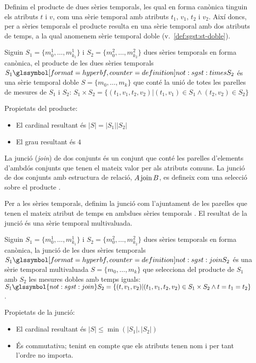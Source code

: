 Definim el producte de dues sèries temporals, les qual en
forma canònica tinguin els atributs $t$ i $v$, com una sèrie temporal
amb atributs $t_1$, $v_1$, $t_2$ i $v_2$. Així doncs, per a sèries
temporals el producte resulta en una sèrie temporal amb dos atributs
de temps, a la qual anomenem sèrie temporal doble (v.\
\autoref{def:sgst:st-doble}).
\begin{definition}[producte]
  Siguin $S_1=\{m_0^1, \dotsc, m_{k_1}^1\}$ i $S_2=\{m_0^2, \dotsc,
  m_{k_2}^2\}$ dues sèries temporals en forma canònica, el producte de
  les dues sèries temporals $S_1 \glssymboldef{not:sgst:times}
  S_2$ és una sèrie temporal doble $S=\{m_0, \dotsc, m_k\}$ que conté
  la unió de totes les parelles de mesures de $S_1$ i $S_2$: $S_1
  \times S_2 = \{ (t_1,v_1,t_2,v_2) | (t_1,v_1) \in S_1 \wedge
  (t_2,v_2) \in S_2 \}$
\end{definition}

Propietats del producte:
\begin{itemize}
\item El cardinal resultant és $|S|=|S_1||S_2|$
\item El grau resultant és $4$
\end{itemize}



La junció (\emph{join}) de dos conjunts és un conjunt que conté les
parelles d'elements d'ambdós conjunts que tenen el mateix valor per
als atributs comuns.  La junció de dos conjunts amb estructura de
relació, $A \operatorname*{join} B$, es defineix com una selecció sobre el
producte \parencite[cap.~7]{date04:introduction8}.


Per a les sèries temporals, definim la junció com l'ajuntament de les
parelles que tenen el mateix atribut de temps en ambdues sèries
temporals . El resultat de la junció és una sèrie temporal
multivaluada.
\begin{definition}[junció]\label{def:sgst:join}
  Siguin $S_1=\{m_0^1, \dotsc, m_{k_1}^1\}$ i $S_2=\{m_0^2, \dotsc,
  m_{k_2}^2\}$ dues sèries temporals en forma canònica, la junció de
  les dues sèries temporals $S_1 \glssymboldef{not:sgst:join} S_2$ és
  una sèrie temporal multivaluada $S=\{m_0, \dotsc, m_k\}$ que
  selecciona del producte de $S_1$ amb $S_2$ les mesures dobles amb
  temps iguals: $S_1 \glssymbol{not:sgst:join} S_2 = \{ (t,v_1,v_2) |
  (t_1,v_1,t_2,v_2) \in S_1\times S_2 \wedge t=t_1=t_2 \}$.
\end{definition}


Propietats de la junció:
\begin{itemize}
\item El cardinal resultant és $|S|\leq\min(|S_1|,|S_2|)$
\item És commutativa; tenint en compte que els atributs tenen nom i
  per tant l'ordre no importa.
\end{itemize}




